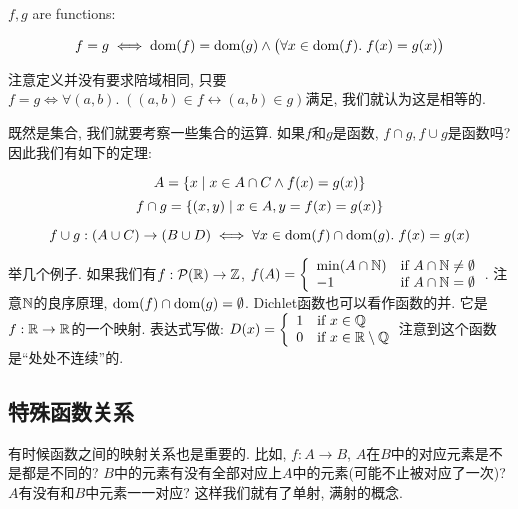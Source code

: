 \begin{theorem}
    
      $f, g$  are functions:
    
    \[
      f = g \iff \text{dom}(f) = \text{dom}(g)
        \land \big(\forall x \in \text{dom}(f).\; f(x) = g(x) \big)
    \]
\end{theorem}

注意定义并没有要求陪域相同, 只要$f = g \iff \forall (a, b).\; ((a, b) \in f \leftrightarrow (a, b) \in g)$满足, 我们就认为这是相等的. 

既然是集合, 我们就要考察一些集合的运算. 如果$f$和$g$是函数, $f \cap g, f \cup g$是函数吗? 因此我们有如下的定理: 

\begin{theorem}
    \[
      A = \{x \mid x \in A \cap C \land f(x) = g(x)\}
    \]
    \[
      f \cap g = \{(x, y) \mid x \in A, y = f(x) = g(x)\}
    \]
\end{theorem}

\begin{theorem}
    {\[
      f \cup g: (A \cup C) \to (B \cup D) \iff
      \forall x \in \text{dom}(f) \cap \text{dom}(g).\; f(x) = g(x)
    \]}
\end{theorem}

举几个例子. 如果我们有$f: \mathcal{P}(\mathbb{R}) \to \mathbb{Z}$, $f(A) = \left\{\begin{array}{ll}
    \min(A \cap \mathbb{N}) & \text{if } A \cap \mathbb{N} \neq \emptyset \\
      -1 & \text{if } A \cap \mathbb{N} = \emptyset
  \end{array}\right.$. 
注意$\mathbb{N}$的良序原理, $\text{dom}{(f)}\cap \text{dom}{(g)}=\emptyset$. Dichlet函数也可以看作函数的并. 它是$f:\mathbb{R} \to \mathbb{R}$的一个映射. 表达式写做: $D(x) = \left\{\begin{array}{ll}
    1 & \text{if } x \in \mathbb{Q} \\
    0 & \text{if } x \in \mathbb{R} \setminus \mathbb{Q}
\end{array}\right.$注意到这个函数是``处处不连续''的. 

\subsection{特殊函数关系}

有时候函数之间的映射关系也是重要的. 比如, $f:A\to B$, $A$在$B$中的对应元素是不是都是不同的? $B$中的元素有没有全部对应上$A$中的元素(可能不止被对应了一次)? $A$有没有和$B$中元素一一对应? 这样我们就有了单射, 满射的概念. 

